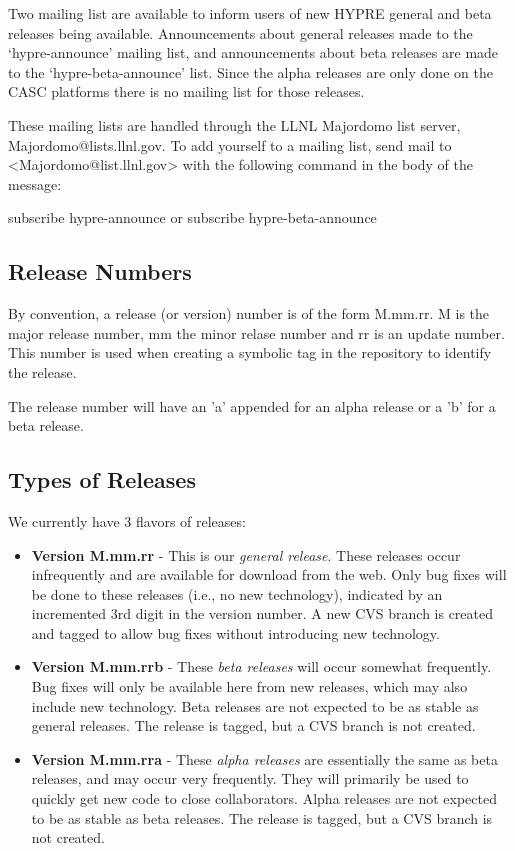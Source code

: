 Two mailing list are available to inform users of new HYPRE general and beta
releases being available.  Announcements about general releases made to the
`hypre-announce' mailing list, and announcements about beta releases are made
to the `hypre-beta-announce' list. Since the alpha releases are only done on
the CASC platforms there is no mailing list for those releases.

These mailing lists are handled through the LLNL Majordomo list server,
Majordomo@lists.llnl.gov. To add yourself to a mailing list, send mail to
<Majordomo@list.llnl.gov> with the following command in the body of the message:

subscribe hypre-announce
        or
subscribe hypre-beta-announce


\subsection{Release Numbers}
\label{Release Numbers}

By convention, a release (or version) number is of the form M.mm.rr.
M is the major release number, mm the minor relase number and rr is an
update number.  This number is used when creating a symbolic tag in the 
repository to identify the release. 

The release number will have an 'a' appended for an alpha release or a 'b'
for a beta release.

\subsection{Types of Releases}
\label{Types of Releases}

\noindent
We currently have 3 flavors of releases:
\begin{itemize}
\item {\bf Version M.mm.rr} - This is our {\em general release}.  These
releases occur infrequently and are available for download from the
web.  Only bug fixes will be done to these releases (i.e., no new
technology), indicated by an incremented 3rd digit in the version
number.  A new CVS branch is created and tagged to allow bug fixes
without introducing new technology.

\item {\bf Version M.mm.rrb} - These {\em beta releases} will occur somewhat
frequently.  Bug fixes will only be available here from new releases,
which may also include new technology.  Beta releases are not expected
to be as stable as general releases.  The release is tagged, but a CVS
branch is not created.

\item {\bf Version M.mm.rra} - These {\em alpha releases} are essentially
the same as beta releases, and may occur very frequently.  They will
primarily be used to quickly get new code to close collaborators.
Alpha releases are not expected to be as stable as beta releases.
The release is tagged, but a CVS branch is not created.
\end{itemize}

